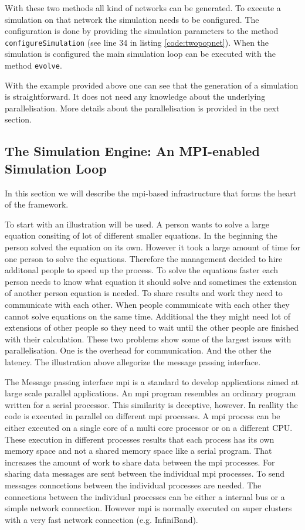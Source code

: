 \documentclass[12pt]{article}
\begin{document}
With these two methods all kind of networks can be generated.
To execute a simulation on that network the simulation needs to be configured.
The configuration is done by providing the simulation parameters to the method \texttt{configureSimulation} (see line 34 in listing \ref{code:twopopnet}).
When the simulation is configured the main simulation loop can be executed with the method \texttt{evolve}.

With the example provided above one can see that the generation of a simulation is straightforward.
It does not need any knowledge about the underlying parallelisation. More details about the parallelisation is provided in the next section.

\subsection{The Simulation Engine: An MPI-enabled Simulation Loop}%
In this section we will describe the mpi-based infrastructure that forms the heart of the framework.

To start with an illustration will be used.
A person wants to solve a large equation consiting of lot of different smaller equations.
In the beginning the person solved the equation on its own.
However it took a large amount of time for one person to solve the equations.
Therefore the management decided to hire additonal people to speed up the process.
To solve the equations faster each person needs to know what equation it should solve and sometimes the extension of another person equation is needed.
To share results and work they need to communicate with each other.
When people communicate with each other they cannot solve equations on the same time.
Additional the they might need lot of extensions of other people so they need to wait until the other people are finished with their calculation.
These two problems show some of the largest issues with parallelisation.
One is the overhead for communication.
And the other the latency.
The illustration above allegorize the message passing interface.

The Message passing interface mpi is a standard to develop applications aimed at large scale parallel applications.
An mpi program resembles an ordinary program written for a serial processor.
This similarity is deceptive, however.
In reallity the code is executed in parallel on different mpi processes.
A mpi process can be either executed on a single core of a multi core processor or on a different CPU.
These execution in different processes results that each process has its own memory space and not a shared memory space like a serial program.
That increases the amount of work to share data between the mpi processes.
For sharing data messages are sent between the individual mpi processes.
To send messages conncetions between the individual processes are needed.
The connections between the individual processes can be either a internal bus or a simple network connection.
However mpi is normally executed on super clusters with a very fast network connection (e.g. InfiniBand).
\end{document}
